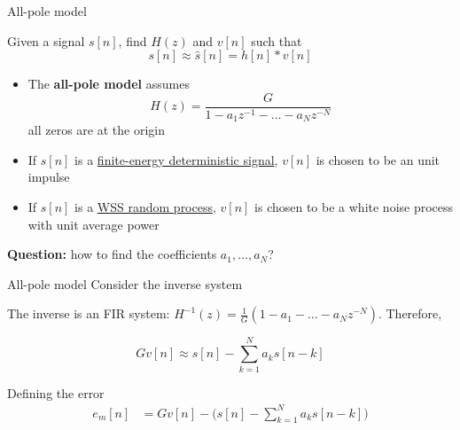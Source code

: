 \documentclass[10pt]{beamer}
\begin{document}
\begin{frame}{All-pole model}
	\begin{center}
	\resizebox{0.5\linewidth}{!}{}
	\end{center}
	
	Given a signal $s[n]$, find $H(z)$ and $v[n]$ such that 
	\begin{equation*}
		s[n] \approx \hat{s}[n] = h[n] \ast v[n]
	\end{equation*}
	
	\begin{itemize}
		\item The \textbf{all-pole model} assumes
		\begin{equation*}
			H(z) = \frac{G}{1 - a_1z^{-1} - \ldots - a_{N}z^{-N}}
		\end{equation*}
		all zeros are at the origin
		\item If $s[n]$ is a \underline{finite-energy deterministic signal}, $v[n]$ is chosen to be an unit impulse
		\item If $s[n]$ is a \underline{WSS random process}, $v[n]$ is chosen to be a white noise process with unit average power
	\end{itemize}

	\textbf{Question:} how to find the coefficients $a_1, \ldots, a_N$?
\end{frame}


\begin{frame}{All-pole model}
Consider the inverse system
\begin{center}
	\def\INVERSE{1}
	\resizebox{0.9\linewidth}{!}{}
\end{center}

The inverse is an FIR system: $H^{-1}(z) = \frac{1}{G}(1 - a_1 - \ldots - a_Nz^{-N})$. Therefore,

\begin{equation*}
Gv[n] \approx s[n] - \sum_{k = 1}^N a_ks[n-k]
\end{equation*}

Defining the error
\begin{align*}
e_m[n] &= Gv[n] - \Big(s[n] - \sum_{k = 1}^N a_ks[n-k]\Big) \tag{modeling error} \\
\end{align*}

\end{frame}
\end{document}

